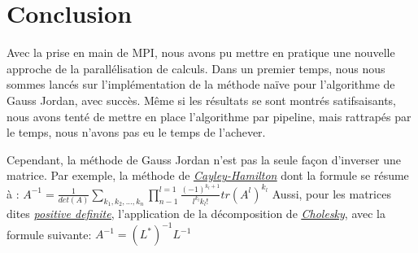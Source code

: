 \documentclass[a4paper, french]{article}
\begin{document}
\section{Conclusion}

Avec la prise en main de MPI, nous avons pu mettre en pratique une nouvelle approche de la parallélisation de
calculs. Dans un premier temps, nous nous sommes lancés sur l'implémentation de la méthode naïve pour l'algorithme
de Gauss Jordan, avec succès. Même si les résultats se sont montrés satifsaisants, nous avons tenté de mettre en
place l'algorithme par pipeline, mais rattrapés par le temps, nous n'avons pas eu le temps de l'achever.

Cependant, la méthode de Gauss Jordan n'est pas la seule façon d'inverser une matrice. Par exemple, la méthode de
\href{https://en.wikipedia.org/wiki/Cayley%E2%80%93Hamilton_theorem}{\textit{\underline{Cayley-Hamilton}}} dont la formule se résume à :\newline
$A^{-1}=\frac{1}{det(A)}\sum_{k_1, k_2,...,k_n}^{}\prod_{n-1}^{l=1}\frac{(-1)^{k_l+1}}{l^{k_l}k_l!}tr(A^l)^{k_l}$
\newline
Aussi, pour les matrices dites \href{https://en.wikipedia.org/wiki/Definite_matrix}{\textit{\underline{positive definite}}},
l'application de la décomposition de \href{https://en.wikipedia.org/wiki/Cholesky_decomposition}{\textit{\underline{Cholesky}}},
avec la formule suivante:
$A^{-1}=(L^*)^{-1}L^{-1}$
\end{document}
